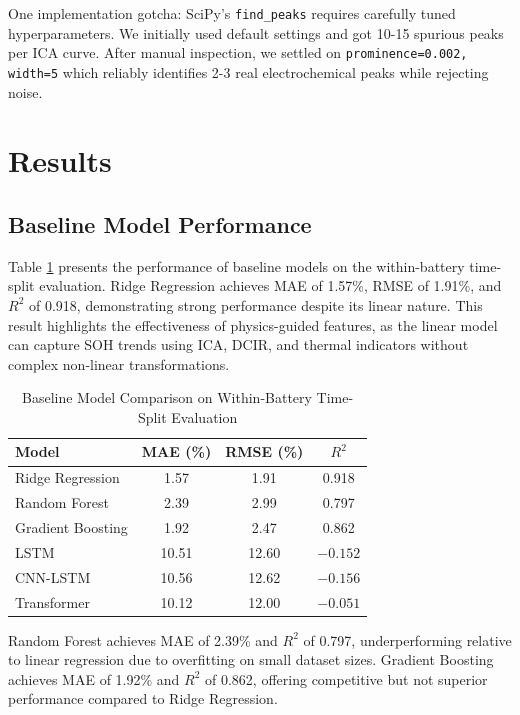 \documentclass{sn-jnl}
\begin{document}
One implementation gotcha: SciPy's \texttt{find\_peaks} requires carefully tuned hyperparameters. We initially used default settings and got 10-15 spurious peaks per ICA curve. After manual inspection, we settled on \texttt{prominence=0.002, width=5} which reliably identifies 2-3 real electrochemical peaks while rejecting noise.

\section{Results}
\label{sec:results}

\subsection{Baseline Model Performance}
\label{subsec:baseline_results}

Table \ref{tab:baseline} presents the performance of baseline models on the within-battery time-split evaluation. Ridge Regression achieves MAE of 1.57\%, RMSE of 1.91\%, and $R^2$ of 0.918, demonstrating strong performance despite its linear nature. This result highlights the effectiveness of physics-guided features, as the linear model can capture SOH trends using ICA, DCIR, and thermal indicators without complex non-linear transformations.

\begin{table}[htbp]
\caption{Baseline Model Comparison on Within-Battery Time-Split Evaluation}
\label{tab:baseline}
\centering
\small
\begin{tabular}{lccc}
\toprule
\textbf{Model} & \textbf{MAE (\%)} & \textbf{RMSE (\%)} & \textbf{$R^2$} \\
\midrule
Ridge Regression & 1.57 & 1.91 & 0.918 \\
Random Forest & 2.39 & 2.99 & 0.797 \\
Gradient Boosting & 1.92 & 2.47 & 0.862 \\
\midrule
LSTM & 10.51 & 12.60 & $-0.152$ \\
CNN-LSTM & 10.56 & 12.62 & $-0.156$ \\
Transformer & 10.12 & 12.00 & $-0.051$ \\
\bottomrule
\end{tabular}
\end{table}

Random Forest achieves MAE of 2.39\% and $R^2$ of 0.797, underperforming relative to linear regression due to overfitting on small dataset sizes. Gradient Boosting achieves MAE of 1.92\% and $R^2$ of 0.862, offering competitive but not superior performance compared to Ridge Regression.
\end{document}
